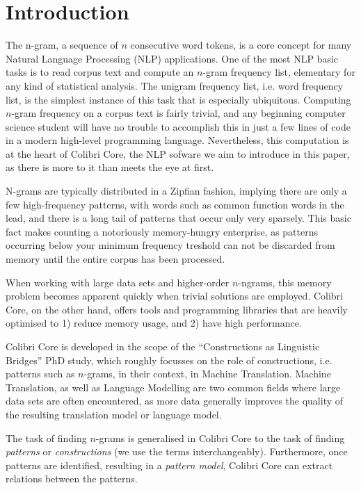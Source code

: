 



\section{Introduction}

The n-gram, a sequence of $n$ consecutive word tokens, is a core concept for
many Natural Language Processing (NLP) applications. One of the most NLP basic
tasks is to read corpus text and compute an $n$-gram frequency list, elementary
for any kind of statistical analysis. The unigram frequency list, i.e. word
frequency list, is the simplest instance of this task that is especially
ubiquitous. Computing $n$-gram frequency on a corpus text is fairly trivial,
and any beginning computer science student will have no trouble to accomplish
this in just a few lines of code in a modern high-level programming language.
Nevertheless, this computation is at the heart of Colibri Core, the NLP sofware
we aim to introduce in this paper, as there is more to it than meets the eye at
first.

N-grams are typically distributed in a Zipfian fashion, implying there are only
a few high-frequency patterns, with words such as common function words in the
lead, and there is a long tail of patterns that occur only very sparsely. This
basic fact makes counting a notoriously memory-hungry enterprise, as patterns
occurring below your minimum frequency treshold can not be discarded from
memory until the entire corpus has been processed. 

When working with large data sets and higher-order $n$-ngrams, this memory
problem becomes apparent quickly when trivial solutions are employed. Colibri
Core, on the other hand, offers tools and programming libraries that are
heavily optimised to 1) reduce memory usage, and 2) have high performance.

Colibri Core is developed in the scope of the ``Constructions as Linguistic
Bridges'' PhD study, which roughly focusses on the role of constructions, i.e.
patterns such as $n$-grams, in their context, in Machine Translation. Machine
Translation, as well as Language Modelling are two common fields where large
data sets are often encountered, as more data generally improves the quality of
the resulting translation model or language model. 

The task of finding $n$-grams is generalised in Colibri Core to the task of
finding \emph{patterns} or \emph{constructions} (we use the terms
interchangeably). Furthermore, once patterns are identified, resulting in a
\emph{pattern model}, Colibri Core can extract relations between the patterns.

